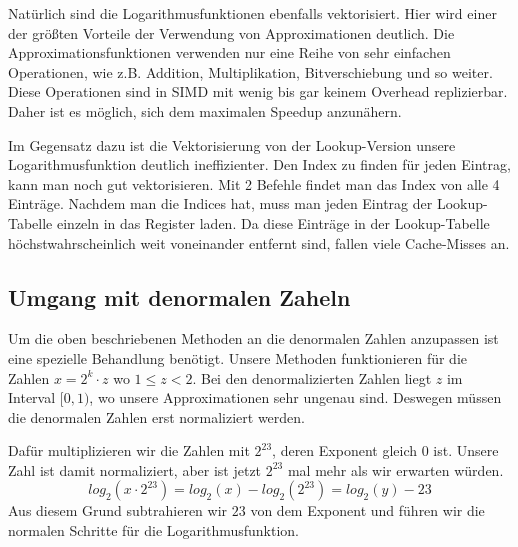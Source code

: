 Natürlich sind die Logarithmusfunktionen ebenfalls vektorisiert. Hier wird einer der größten Vorteile der Verwendung von Approximationen deutlich. Die Approximationsfunktionen verwenden nur eine Reihe von sehr einfachen Operationen, wie z.B. Addition, Multiplikation, Bitverschiebung und so weiter. Diese Operationen sind in SIMD mit wenig bis gar keinem Overhead replizierbar. Daher ist es möglich, sich dem maximalen Speedup anzunähern.

Im Gegensatz dazu ist die Vektorisierung von der Lookup-Version unsere Logarithmusfunktion deutlich ineffizienter. Den Index zu finden für jeden Eintrag, kann man noch gut vektorisieren. Mit 2 Befehle findet man das Index von alle 4 Einträge. Nachdem man die Indices hat, muss man jeden Eintrag der Lookup-Tabelle einzeln in das Register laden. Da diese Einträge in der Lookup-Tabelle höchstwahrscheinlich weit voneinander entfernt sind, fallen viele Cache-Misses an. 

\subsection{Umgang mit denormalen Zaheln}
Um die oben beschriebenen Methoden an die denormalen Zahlen anzupassen ist eine spezielle Behandlung benötigt. Unsere Methoden funktionieren für die Zahlen $x = 2^k \cdot z$ wo $1 \leq z < 2$. Bei den denormalizierten Zahlen liegt $z$ im Interval $[0,1)$, wo unsere Approximationen sehr ungenau sind. Deswegen müssen die denormalen Zahlen erst normaliziert werden. 

Dafür multiplizieren wir die Zahlen mit $2^{23}$, deren Exponent gleich $0$ ist. Unsere Zahl ist damit normaliziert, aber ist jetzt $2^{23}$ mal mehr als wir erwarten würden. \[log_2(x\cdot 2^{23}) = log_2(x) - log_2(2^{23}) = log_2(y) - 23\]
Aus diesem Grund subtrahieren wir $23$ von dem Exponent und führen wir die normalen Schritte für die Logarithmusfunktion.



